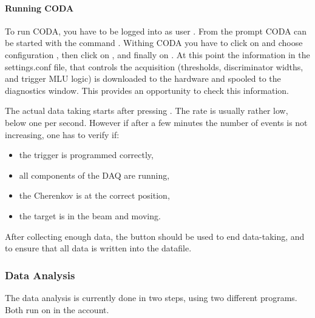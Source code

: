 {{\paragraph{Running CODA \\ }

To run CODA, you have to be logged into  as user
. From the prompt CODA can be started with the
command . Withing CODA you have to click 
on  and choose configuration ,
then click on , and finally on .
At this point the information in the settings.conf file,
 that controls the acquisition
(thresholds, discriminator widths, and trigger MLU logic) is downloaded to the
hardware and spooled to the diagnostics window. This provides an opportunity
to check this information.

The actual data taking starts after pressing . The rate 
is usually rather low, below one per second. However if after 
a few minutes the number of events is not increasing, one has to 
verify if:
\begin{itemize}
\item the trigger is programmed correctly,
\item all components of the DAQ are running,
\item the Cherenkov is at the correct position,
\item the target is in the beam and moving.
\end{itemize}
After collecting enough data, the  button should be used
to end data-taking, and to ensure that all data is written into the 
datafile.

\subsubsection{Data Analysis}
\label{sec:ep_analysis}

The data analysis is currently done in two steps, using
two different programs. Both run on  in the
 account.

}}
